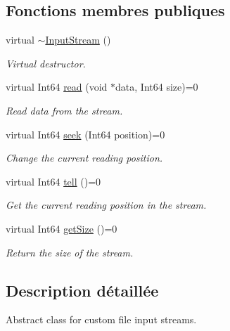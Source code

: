 \subsection*{Fonctions membres publiques}
\begin{DoxyCompactItemize}
\item 
\mbox{\label{classsf_1_1InputStream_a4b2eb0f92323e630bd0542bc6191682e}} 
virtual \hyperlink{classsf_1_1InputStream_a4b2eb0f92323e630bd0542bc6191682e}{$\sim$\+Input\+Stream} ()
\begin{DoxyCompactList}\small\item\em Virtual destructor. \end{DoxyCompactList}\item 
virtual Int64 \hyperlink{classsf_1_1InputStream_a8dd89c74c1acb693203f50e750c6ae53}{read} (void $\ast$data, Int64 size)=0
\begin{DoxyCompactList}\small\item\em Read data from the stream. \end{DoxyCompactList}\item 
virtual Int64 \hyperlink{classsf_1_1InputStream_a76aba8e5d5cf9b1c5902d5e04f7864fc}{seek} (Int64 position)=0
\begin{DoxyCompactList}\small\item\em Change the current reading position. \end{DoxyCompactList}\item 
virtual Int64 \hyperlink{classsf_1_1InputStream_a599515b9ccdbddb6fef5a98424fd559c}{tell} ()=0
\begin{DoxyCompactList}\small\item\em Get the current reading position in the stream. \end{DoxyCompactList}\item 
virtual Int64 \hyperlink{classsf_1_1InputStream_a311eaaaa65d636728e5153b574b72d5d}{get\+Size} ()=0
\begin{DoxyCompactList}\small\item\em Return the size of the stream. \end{DoxyCompactList}\end{DoxyCompactItemize}


\subsection{Description détaillée}
Abstract class for custom file input streams. 

